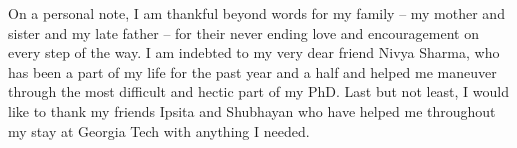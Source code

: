 \begin{acknowledgments}
\par On a personal note, I am thankful beyond words for my family -- my mother and sister and my late father -- for their never ending love and encouragement on every step of the way. I am indebted to my very dear friend Nivya Sharma, who has been a part of my life for the past year and a half and helped me maneuver through the most difficult and hectic part of my PhD. Last but not least, I would like to thank my friends Ipsita and Shubhayan who have helped me throughout my stay at Georgia Tech with anything I needed.
\end{acknowledgments}
